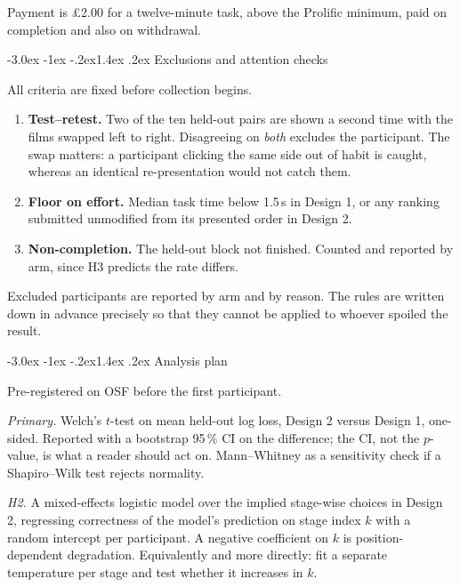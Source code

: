 \documentclass[11pt,a4paper]{article}
\makeatletter
\renewcommand\subsection{\@startsection{subsection}{2}{\z@}%
  {-3.0ex \@plus -1ex \@minus -.2ex}{1.4ex \@plus .2ex}%
  {\normalfont\large\sffamily\bfseries\color{accent}}}
\newenvironment{steps}
  {\begin{enumerate}\setlength{\itemsep}{0.15em}\setlength{\parskip}{0.15em}}
  {\end{enumerate}}
\makeatother
\begin{document}
Payment is \pounds 2.00 for a twelve-minute task, above the Prolific minimum,
paid on completion and also on withdrawal.

\subsection{Exclusions and attention checks}
\label{sec:exclusions}

All criteria are fixed before collection begins.

\begin{steps}
\item \textbf{Test--retest.} Two of the ten held-out pairs are shown a second
  time with the films swapped left to right. Disagreeing on \emph{both} excludes
  the participant. The swap matters: a participant clicking the same side out of
  habit is caught, whereas an identical re-presentation would not catch them.
\item \textbf{Floor on effort.} Median task time below 1.5\,s in Design 1, or any
  ranking submitted unmodified from its presented order in Design 2.
\item \textbf{Non-completion.} The held-out block not finished. Counted and
  reported by arm, since H3 predicts the rate differs.
\end{steps}

Excluded participants are reported by arm and by reason. The rules are written
down in advance precisely so that they cannot be applied to whoever spoiled the
result.

\subsection{Analysis plan}

Pre-registered on OSF before the first participant.

\emph{Primary.} Welch's $t$-test on mean held-out log loss, Design 2 versus
Design 1, one-sided. Reported with a bootstrap 95\,\% CI on the difference; the
CI, not the $p$-value, is what a reader should act on. Mann--Whitney as a
sensitivity check if a Shapiro--Wilk test rejects normality.

\emph{H2.} A mixed-effects logistic model over the implied stage-wise choices in
Design 2, regressing correctness of the model's prediction on stage index $k$
with a random intercept per participant. A negative coefficient on $k$ is
position-dependent degradation. Equivalently and more directly: fit a separate
temperature per stage and test whether it increases in $k$.
\end{document}
